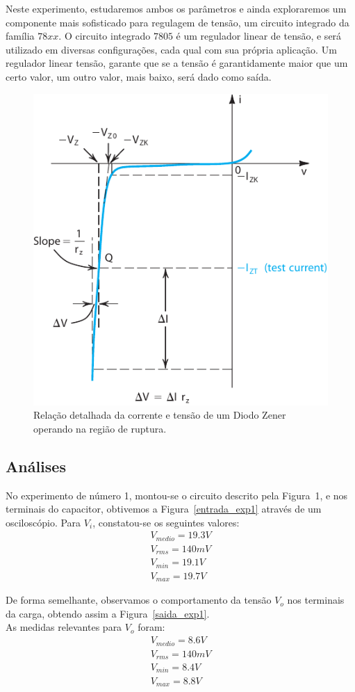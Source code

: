 \documentclass[12pt,a4paper]{article}
\begin{document}
Neste experimento, estudaremos ambos os parâmetros e ainda exploraremos um componente mais sofisticado para regulagem de tensão, um circuito integrado da família $78xx$. O circuito integrado $7805$ é um regulador linear de tensão, e será utilizado em diversas configurações, cada qual com sua própria aplicação. Um regulador linear tensão, garante que se a tensão é garantidamente maior que um certo valor, um outro valor, mais baixo, será dado como saída.

\begin{figure}[htpb]
  \centering
  \includegraphics[width=0.6\linewidth]{breakdown_region.pdf}
  \caption{Relação detalhada da corrente e tensão de um Diodo Zener operando na região de ruptura.}
  \label{fig:breakdown}
\end{figure}

\newpage
\subsection{Análises}

No experimento de número 1, montou-se o circuito descrito pela Figura~1, e nos terminais do capacitor, obtivemos a Figura~\ref{entrada_exp1} através de um osciloscópio. Para $V_{i}$, constatou-se os seguintes valores:
\begin{align*}
V_{medio} = 19.3 V \\
V_{rms} = 140 mV \\
V_{min} = 19.1 V \\
V_{max} = 19.7 V 
\end{align*}

De forma semelhante, observamos o comportamento da tensão $V_o$ nos terminais da carga, obtendo assim a Figura~\ref{saida_exp1}. \\ As medidas relevantes para $V_{o}$ foram:
\begin{align*}
V_{medio} = 8.6 V \\
V_{rms} = 140 mV \\
V_{min} = 8.4 V \\
V_{max} = 8.8 V 
\end{align*}
\end{document}
